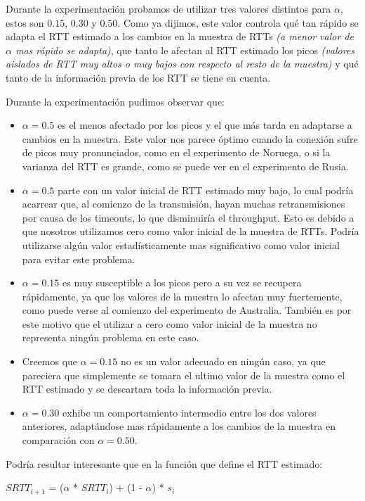 Durante la experimentación probamos de utilizar tres valores distintos para $\alpha$, estos son $0.15$, $0.30$ y $0.50$. Como ya dijimos, este valor controla qué tan rápido se adapta el RTT estimado a los cambios en la muestra de RTTs \textit{(a menor valor de $\alpha$ mas rápido se adapta)}, que tanto le afectan al RTT estimado los picos \textit{(valores aislados de RTT muy altos o muy bajos con respecto al resto de la muestra)} y qué tanto de la información previa de los RTT se tiene en cuenta.

Durante la experimentación pudimos observar que:
\begin{itemize}
  \item $\alpha = 0.5$ es el menos afectado por los picos y el que más tarda en adaptarse a cambios en la muestra. Este valor nos parece óptimo cuando la conexión sufre de picos muy pronunciados, como en el experimento de Noruega, o si la varianza del RTT es grande, como se puede ver en el experimento de Rusia.

  \item $\alpha = 0.5$ parte con un valor inicial de RTT estimado muy bajo, lo cual podría acarrear que, al comienzo de la transmisión, hayan muchas retransmisiones por causa de los timeouts, lo que disminuiría el throughput. Esto es debido a que nosotros utilizamos cero como valor inicial de la muestra de RTTs. Podría utilizarse algún valor estadísticamente mas significativo como valor inicial para evitar este problema.

  \item $\alpha = 0.15$ es muy susceptible a los picos pero a su vez se recupera rápidamente, ya que los valores de la muestra lo afectan muy fuertemente, como puede verse al comienzo del experimento de Australia. También es por este motivo que el utilizar a cero como valor inicial de la muestra no representa ningún problema en este caso.

  \item Creemos que $\alpha = 0.15$ no es un valor adecuado en ningún caso, ya que pareciera que simplemente se tomara el ultimo valor de la muestra como el RTT estimado y se descartara toda la información previa.

  \item $\alpha = 0.30$ exhibe un comportamiento intermedio entre los dos valores anteriores, adaptándose mas rápidamente a los cambios de la muestra en comparación con $\alpha = 0.50$.
\end{itemize}

Podría resultar interesante que en la función que define el RTT estimado:
\begin{center}
  $SRTT_{i+1}$ = ($\alpha$ * $SRTT_i$) + (1 - $\alpha$) * $s_i$
\end{center}


